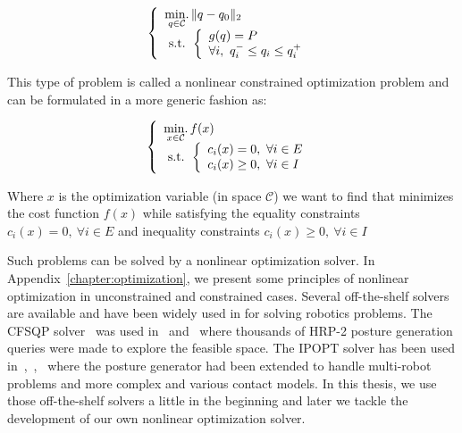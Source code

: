 \begin{equation}
  \left\{
  \begin{array}{l}
    \operatorname*{min.}\limits_{q\in\mathcal{C}}{\|q-q_0\|_2}\\
    \text{ s.t. }
    \left\{
    \begin{array}{l}
      g(q)=P\\
      \forall i,\ q_i^- \leq q_i \leq q_i^+
    \end{array}
    \right.
  \end{array}
  \right.
\end{equation}

This type of problem is called a nonlinear constrained optimization problem and can be formulated in a more generic fashion as:

\begin{equation}
\label{eq:optim_form_PG}
  \left\{
  \begin{array}{l}
    \operatorname*{min.}\limits_{x\in\mathcal{C}}{f(x)}\\
    \text{ s.t. }
    \left\{
    \begin{array}{l}
      c_i(x) = 0,\ \forall i\in{E}\\
      c_i(x) \geq 0,\ \forall i\in{I}\\
    \end{array}
    \right.
  \end{array}
  \right.
\end{equation}

Where $x$ is the optimization variable (in space $\mathcal{C}$) we want to find that minimizes the cost function $f(x)$ while satisfying the equality constraints $c_i(x) = 0,\ \forall i\in{E}$ and inequality constraints $c_i(x) \geq 0,\ \forall i\in{I}$

Such problems can be solved by a nonlinear optimization solver.
In Appendix~\ref{chapter:optimization}, we present some principles of nonlinear optimization in unconstrained and constrained cases.
Several off-the-shelf solvers are available and have been widely used in for solving robotics problems.
The CFSQP solver~\cite{cfsqp:manual} was used in~\cite{escande:iros:2009} and~\cite{escande:ras:2013} where thousands of HRP-2 posture generation queries were made to explore the feasible space.
The IPOPT solver has been used in~\cite{vaillant:humanoids:2014},~\cite{vaillant:autonomousrobots:2016},~\cite{bouyarmane:ar:2012} where the posture generator had been extended to handle multi-robot problems and more complex and various contact models.
In this thesis, we use those off-the-shelf solvers a little in the beginning and later we tackle the development of our own nonlinear optimization solver.

